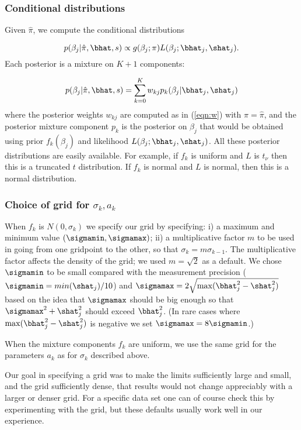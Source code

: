 \subsubsection*{Conditional distributions}

Given $\hat\pi$, we compute the conditional distributions

\begin{equation}
p(\beta_j | \hat\pi, \bhat, s) \propto g(\beta_j; \pi) L(\beta_j; \bhat_j, \shat_j).
\end{equation}
Each posterior is a mixture on $K+1$ components:

\begin{equation}
p(\beta_j | \hat\pi, \bhat, s) = \sum_{k=0}^K w_{kj} p_k(\beta_j | \bhat_j, \shat_j)
\end{equation}
where the posterior weights $w_{kj}$ are computed as in (\ref{eqn:w}) with $\pi=\hat\pi$,
and the posterior mixture component $p_k$ is the posterior on $\beta_j$ that would be obtained using prior 
$f_k(\beta_j)$ and likelihood $L(\beta_j; \bhat_j,\shat_j)$.
All these posterior distributions are easily available.
For example, if $f_k$ is uniform and $L$ is $t_\nu$ then this is a truncated $t$ distribution.
If $f_k$ is normal and $L$ is normal, then this is a normal distribution.

\subsubsection*{Choice of grid for $\sigma_k, a_k$} \label{sec:grid}

When $f_k$ is $N(0,\sigma_k)$ we specify our grid by specifying: i) a maximum and minimum value $(\sigmamin,\sigmamax)$; ii) a multiplicative factor $m$ to be used
in going from one gridpoint to the other, so that $\sigma_{k} = m \sigma_{k-1}$. The multiplicative factor affects the density of the grid; we used $m=\sqrt{2}$
as a default. We chose $\sigmamin$ to be small compared with the measurement precision ($\sigmamin=min(\shat_j)/10$) and $\sigmamax= 2\sqrt{\max(\bhat_j^2-\shat_j^2)}$
based on the idea that $\sigmamax$ should be big enough so that  $\sigmamax^2 + \shat_j^2$ should exceed $\bhat_j^2$.   (In rare cases where $\max(\bhat_j^2-\shat_j^2)$
is negative we set $\sigmamax = 8\sigmamin$.)

When the mixture components $f_k$ are uniform, we use the same grid for the parameters $a_k$ as for $\sigma_k$ described above.

Our goal in specifying a grid was to make the limits sufficiently large and small, and the grid sufficiently dense, that results would not change appreciably with 
a larger or denser grid. For a specific data set one can of course check this by experimenting with the grid, but these defaults usually work well in our experience.

\appendix